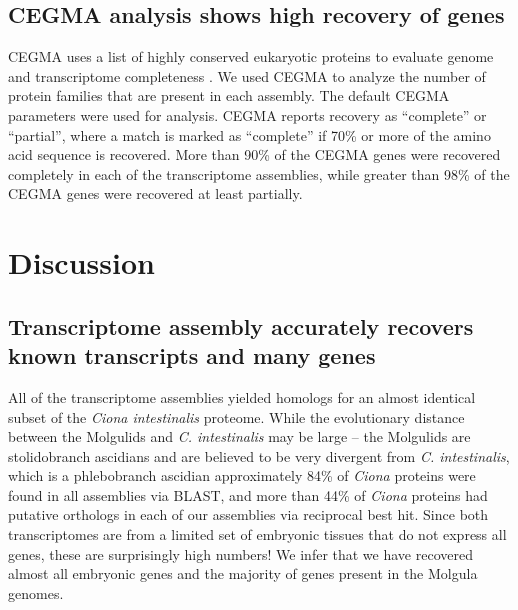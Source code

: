 \subsection{CEGMA analysis shows high recovery of genes}
CEGMA uses a list of highly conserved eukaryotic proteins to evaluate genome and transcriptome completeness \citep{parra_cegma:_2007}. We used CEGMA to analyze the number of protein families that are present in each assembly. The default CEGMA parameters were used for analysis. CEGMA reports recovery as ``complete'' or ``partial'', where a match is marked as ``complete'' if 70\% or more of the amino acid sequence is recovered. More than 90\% of the CEGMA genes were recovered completely in each of the transcriptome assemblies, while greater than 98\% of the CEGMA genes were recovered at least partially. 

\section{Discussion}

\subsection{Transcriptome assembly accurately recovers known transcripts and many genes}


All of the transcriptome assemblies yielded homologs for an almost identical subset of the \textit{Ciona intestinalis} proteome.  While the evolutionary distance between the Molgulids and \textit{C. intestinalis} may be large -- the Molgulids are stolidobranch ascidians and are believed to be very divergent from \textit{C. intestinalis}, which is a phlebobranch ascidian \citep{huber_evolution_2000, stach_phylogeny_2002}\textemdash approximately 84\% of \textit{Ciona} proteins were found in all assemblies via BLAST, and more than 44\% of \textit{Ciona} proteins had putative orthologs in each of our assemblies via reciprocal best hit.  Since both transcriptomes are from a limited set of embryonic tissues that do not express all genes, these are surprisingly high numbers!  We infer that we have recovered almost all embryonic genes and the majority of genes present in the Molgula genomes.

